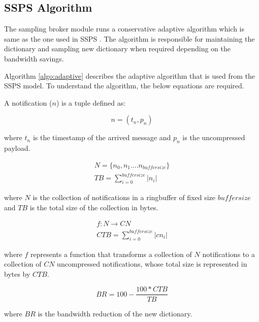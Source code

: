 \subsection{SSPS Algorithm} \label{subsection:algo}

The sampling broker module runs a conservative adaptive algorithm which is same as the one used in SSPS \parencite{Doblander:2016:SDC}. The algorithm is responsible for maintaining the dictionary and sampling new dictionary when required depending on the bandwidth savings. 

Algorithm \ref{algo:adaptive} describes the adaptive algorithm that is used from the SSPS model. To understand the algorithm, the below equations are required.

A notification ($n$) is a tuple defined as:

\begin{equation} \label{eq:1}
n = (t_{n},p_{n})
\end{equation}	

where $t_{n}$ is the timestamp of the arrived message and $p_{n}$ is the uncompressed payload.

\begin{equation} \label{eq:2}
\begin{aligned}
N = \{n_{0},n_{1}....n_{buffersize}\} \\
TB = \displaystyle\sum_{i=0}^{buffersize} |n_{i}| 
\end{aligned}
\end{equation}	

where $N$ is the collection of notifications in a ringbuffer of fixed size $buffersize$ and $TB$ is the total size of the collection in bytes. 

\begin{equation} \label{eq:3}
\begin{aligned}
f : N \rightarrow CN \\
CTB = \displaystyle\sum_{i=0}^{buffersize} |cn_{i}| 
\end{aligned}
\end{equation}

where $f$ represents a function that transforms a collection of $N$ notifications to a collection of $CN$ uncompressed notifications, whose total size is represented in bytes by $CTB$.

\begin{equation} \label{eq:4}
BR = 100 - \dfrac {100 * CTB}{TB}
\end{equation}

where $BR$ is the bandwidth reduction of the new dictionary. 

